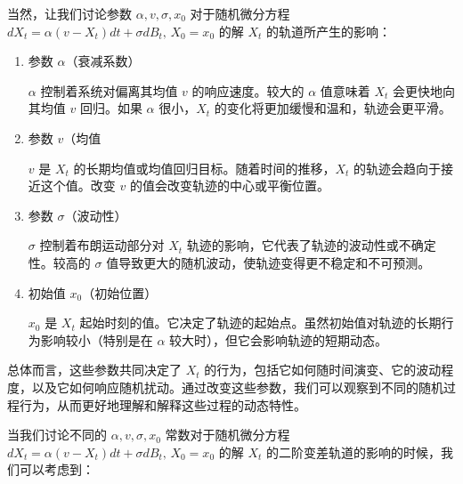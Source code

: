 \documentclass[12pt,a4paper]{article}
\begin{document}
当然，让我们讨论参数 \( \alpha, v, \sigma, x_0 \) 对于随机微分方程 \( dX_t = \alpha (v - X_t) dt + \sigma dB_t, \, X_0 = x_0 \) 的解 \( X_t \) 的轨道所产生的影响：
\begin{enumerate}
    \item 参数 \( \alpha \)（衰减系数）
    \par \( \alpha \) 控制着系统对偏离其均值 \( v \) 的响应速度。较大的 \( \alpha \) 值意味着 \( X_t \) 会更快地向其均值 \( v \) 回归。如果 \( \alpha \) 很小，\( X_t \) 的变化将更加缓慢和温和，轨迹会更平滑。
    \item 参数 \( v \)（均值
    \par \( v \) 是 \( X_t \) 的长期均值或均值回归目标。随着时间的推移，\( X_t \) 的轨迹会趋向于接近这个值。改变 \( v \) 的值会改变轨迹的中心或平衡位置。

    \item 参数 \( \sigma \)（波动性）
    \par \( \sigma \) 控制着布朗运动部分对 \( X_t \) 轨迹的影响，它代表了轨迹的波动性或不确定性。较高的 \( \sigma \) 值导致更大的随机波动，使轨迹变得更不稳定和不可预测。

    \item 初始值 \( x_0 \)（初始位置）
    \par \( x_0 \) 是 \( X_t \) 起始时刻的值。它决定了轨迹的起始点。虽然初始值对轨迹的长期行为影响较小（特别是在 \( \alpha \) 较大时），但它会影响轨迹的短期动态。


\end{enumerate}
总体而言，这些参数共同决定了 \( X_t \) 的行为，包括它如何随时间演变、它的波动程度，以及它如何响应随机扰动。通过改变这些参数，我们可以观察到不同的随机过程行为，从而更好地理解和解释这些过程的动态特性。
\par
当我们讨论不同的 \( \alpha, v, \sigma, x_0 \) 常数对于随机微分方程 \( dX_t = \alpha (v - X_t) dt + \sigma dB_t, \, X_0 = x_0 \) 的解 \( X_t \) 的二阶变差轨道的影响的时候，我们可以考虑到：
\end{document}
